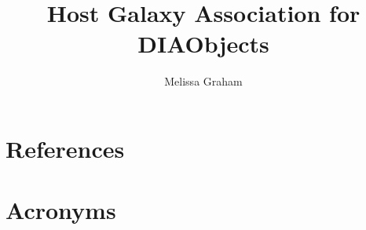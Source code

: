 \documentclass[DM,authoryear,toc]{lsstdoc}
\title{Host Galaxy Association for DIAObjects}
\author{%
Melissa Graham
}
\date{\vcsDate}
\begin{document}
\maketitle


\appendix
\section{References} \label{sec:bib}


\section{Acronyms} \label{sec:acronyms}

\end{document}
